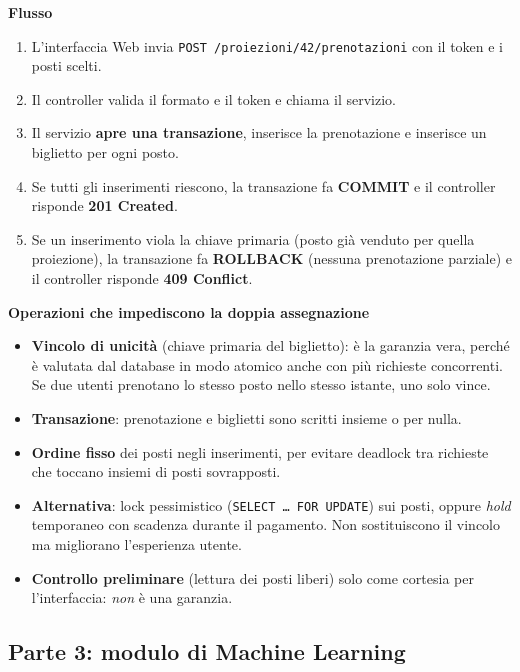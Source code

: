 \textbf{Flusso}
\begin{enumerate}
    \item L'interfaccia Web invia \texttt{POST /proiezioni/42/prenotazioni} con il token e i posti scelti.
    \item Il controller valida il formato e il token e chiama il servizio.
    \item Il servizio \textbf{apre una transazione}, inserisce la prenotazione e inserisce un biglietto per ogni posto.
    \item Se tutti gli inserimenti riescono, la transazione fa \textbf{COMMIT} e il controller risponde \textbf{201 Created}.
    \item Se un inserimento viola la chiave primaria (posto già venduto per quella proiezione), la transazione fa \textbf{ROLLBACK} (nessuna prenotazione parziale) e il controller risponde \textbf{409 Conflict}.
\end{enumerate}

\textbf{Operazioni che impediscono la doppia assegnazione}
\begin{itemize}
    \item \textbf{Vincolo di unicità} (chiave primaria del biglietto): è la garanzia vera, perché è valutata dal database in modo atomico anche con più richieste concorrenti. Se due utenti prenotano lo stesso posto nello stesso istante, uno solo vince.
    \item \textbf{Transazione}: prenotazione e biglietti sono scritti insieme o per nulla.
    \item \textbf{Ordine fisso} dei posti negli inserimenti, per evitare deadlock tra richieste che toccano insiemi di posti sovrapposti.
    \item \textbf{Alternativa}: lock pessimistico (\texttt{SELECT \ldots{} FOR UPDATE}) sui posti, oppure \emph{hold} temporaneo con scadenza durante il pagamento. Non sostituiscono il vincolo ma migliorano l'esperienza utente.
    \item \textbf{Controllo preliminare} (lettura dei posti liberi) solo come cortesia per l'interfaccia: \emph{non} è una garanzia.
\end{itemize}

\subsection{Parte 3: modulo di Machine Learning}

